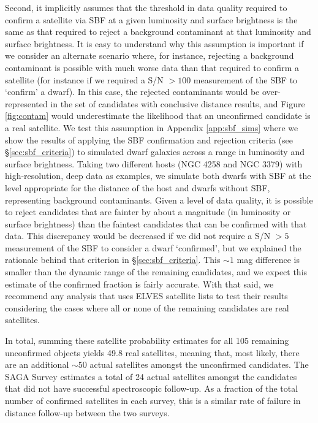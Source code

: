 \documentclass[twocolumn]{aastex62}
\begin{document}
Second, it implicitly assumes that the threshold in data quality required to confirm a satellite via SBF at a given luminosity and surface brightness is the same as that required to reject a background contaminant at that luminosity and surface brightness. It is easy to understand why this assumption is important if we consider an alternate scenario where, for instance, rejecting a background contaminant is possible with much worse data than that required to confirm a satellite (for instance if we required a S/N $>100$ measurement of the SBF to `confirm' a dwarf). In this case, the rejected contaminants would be over-represented in the set of candidates with conclusive distance results, and Figure \ref{fig:contam} would underestimate the likelihood that an unconfirmed candidate is a real satellite. We test this assumption in Appendix \ref{app:sbf_sims} where we show the results of applying the SBF confirmation and rejection criteria (see \S\ref{sec:sbf_criteria}) to simulated dwarf galaxies across a range in luminosity and surface brightness. Taking two different hosts (NGC 4258 and NGC 3379) with high-resolution, deep data as examples, we simulate both dwarfs with SBF at the level appropriate for the distance of the host and dwarfs without SBF, representing background contaminants. Given a level of data quality, it is possible to reject candidates that are fainter by about a magnitude (in luminosity or surface brightness) than the faintest candidates that can be confirmed with that data. This discrepancy would be decreased if we did not require a S/N $>5$ measurement of the SBF to consider a dwarf `confirmed', but we explained the rationale behind that criterion in \S\ref{sec:sbf_criteria}. This $\sim1$ mag difference is smaller than the dynamic range of the remaining candidates, and we expect this estimate of the confirmed fraction is fairly accurate. With that said, we recommend any analysis that uses ELVES satellite lists to test their results considering the cases where all or none of the remaining candidates are real satellites. 


In total, summing these satellite probability estimates for all 105 remaining unconfirmed objects yields 49.8 real satellites, meaning that, most likely, there are an additional $\sim50$ actual satellites amongst the unconfirmed candidates. The SAGA Survey \citep[\S 5.3 of][]{mao2020} estimates a total of 24 actual satellites amongst the candidates that did not have successful spectroscopic follow-up. As a fraction of the total number of confirmed satellites in each survey, this is a similar rate of failure in distance follow-up between the two surveys. 
\end{document}
